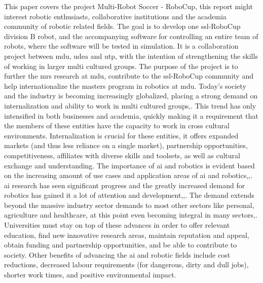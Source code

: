 This paper covers the project Multi-Robot Soccer - RoboCup, this report might interest robotic enthusiasts, collaborative institutions and the academia community of robotic related fields. 
The goal is to develop one \ac{ssl}-RoboCup division B robot, and the accompanying software for controlling an entire team of robots, where the software will be tested in simulation. It is a collaboration project between \ac{mdu}, \ac{udea} and \ac{utp}, with the intention of strengthening the skills of working in larger multi cultured groups.
The purpose of the project is to further the \ac{mrs} research at \ac{mdu}, contribute to the \ac{ssl}-RoboCup community and help internationalize the masters program in robotics at \ac{mdu}.
Today's society and the industry is becoming increasingly globalized, placing a strong demand on internalization and ability to work in multi cultured groups\:\cite{cotton_interaction_2013},\cite{zhou_analysis_2017}. This trend has only intensified in both businesses and academia, quickly making it a requirement that the members of these entities have the capacity to work in cross cultural environments\:\cite{zhou_analysis_2017}.
Internalization is crucial for these entities\:\cite{zhou_analysis_2017}, it offers expanded markets (and thus less reliance on a single market), partnership opportunities, competitiveness, affiliates with diverse skills and toolsets, as well as cultural exchange and understanding.
The importance of \ac{ai} and robotics is evident based on the increasing amount of use cases and application areas of \ac{ai} and robotics\:\cite{singh_artificial_2022},\cite{cai_mobile_2021},\cite{rahman_tahir_localization_2022}. \ac{ai} research has seen significant progress and the greatly increased demand for robotics has gained it a lot of attention and development\:\cite{singh_artificial_2022},\cite{cai_mobile_2021},\cite{rahman_tahir_localization_2022}. The demand extends beyond the massive industry sector demands to most other sectors  like personal, agriculture and healthcare, at this point even becoming integral in many sectors\:\cite{rahman_tahir_localization_2022},\cite{alatise_review_2020}.
Universities must stay on top of these advances in order to offer relevant education, find new innovative research areas, maintain reputation and appeal, obtain funding and partnership opportunities, and be able to contribute to society. 
Other benefits of advancing the \ac{ai} and robotic fields include cost reductions, decreased labour requirements (for dangerous, dirty and dull jobs), shorter work times, and positive environmental impact\:\cite{rahman_tahir_localization_2022}.

